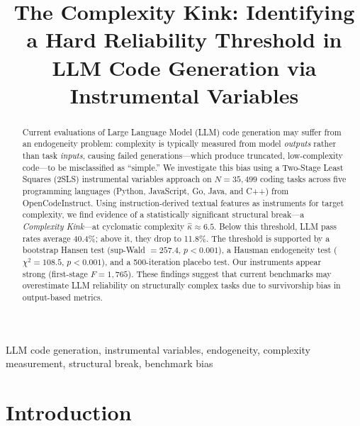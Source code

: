 \documentclass[conference]{IEEEtran}
\title{The Complexity Kink: Identifying a Hard Reliability Threshold in LLM Code Generation via Instrumental Variables}
\author{
\IEEEauthorblockN{Michael Hernandez}
\IEEEauthorblockA{Plethora Solutions, LLC\thanks{\url{https://plethorasolutions.llc}}}
}
\begin{document}
\maketitle

\begin{center}
\end{center}

\begin{abstract}
Current evaluations of Large Language Model (LLM) code generation may suffer from an endogeneity problem: complexity is typically measured from model \emph{outputs} rather than task \emph{inputs}, causing failed generations---which produce truncated, low-complexity code---to be misclassified as ``simple.'' We investigate this bias using a Two-Stage Least Squares (2SLS) instrumental variables approach on $N=35{,}499$ coding tasks across five programming languages (Python, JavaScript, Go, Java, and C++) from OpenCodeInstruct. Using instruction-derived textual features as instruments for target complexity, we find evidence of a statistically significant structural break---a \emph{Complexity Kink}---at cyclomatic complexity $\hat{\kappa} \approx 6.5$. Below this threshold, LLM pass rates average 40.4\%; above it, they drop to 11.8\%. The threshold is supported by a bootstrap Hansen test (sup-Wald $= 257.4$, $p < 0.001$), a Hausman endogeneity test ($\chi^2 = 108.5$, $p < 0.001$), and a 500-iteration placebo test. Our instruments appear strong (first-stage $F = 1{,}765$). These findings suggest that current benchmarks may overestimate LLM reliability on structurally complex tasks due to survivorship bias in output-based metrics.
\end{abstract}

\begin{IEEEkeywords}
LLM code generation, instrumental variables, endogeneity, complexity measurement, structural break, benchmark bias
\end{IEEEkeywords}

\section{Introduction}
\end{document}
